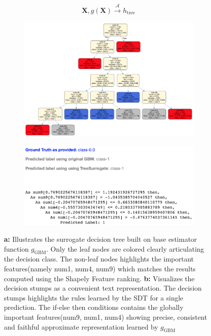 \documentclass{article}
\begin{document}
\begin{equation}
\mathbf{X}, g(\mathbf{X}) \xrightarrow{\mathcal{A}} h_{\text{tree}}
\end{equation}

\begin{figure}[H]
	\begin{subfigure}[tb]{.5\textwidth}
		\begin{center}
			\includegraphics[width=\linewidth]{img/sdt_visualization}
			\caption{}
			\label{fig:surrogate_dt}
		\end{center}
	\end{subfigure}%
	\begin{subfigure}[tb]{.5\textwidth}
		\begin{center}
			\includegraphics[width=1.3\linewidth]{img/decision_stumps_txt}
			\caption{}
			\label{fig:surrogate_dt}
		\end{center}
	\end{subfigure}%
	\captionsetup{font=footnotesize}
	\caption{\textbf{a:} Illustrates the surrogate decision tree built on base estimator function $g_{\text{GBM}}$. Only the leaf nodes are colored clearly articulating the decision class. The non-leaf nodes highlights the important features(namely num1, num4, num9) 
	which matches the results computed using the Shapely Feature ranking. \textbf{b:} Visualizes the decision stumps as a convenient text representation. The decision stumps highlights the rules learned by the SDT for a single prediction. The if-else then
	conditions contains the globally important features(num9, num1, num4) showing precise, consistent and faithful approximate representation learned by $g_{\text{GBM}}$}
\end{figure}
\end{document}
